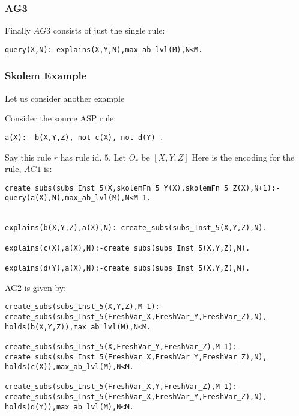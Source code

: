 \documentclass{article}
\begin{document}
\subsubsection{AG3}
Finally $AG3$ consists of just the single rule:
\begin{verbatim}
query(X,N):-explains(X,Y,N),max_ab_lvl(M),N<M.
\end{verbatim}
\subsubsection{Skolem Example}
Let us consider another example

Consider the source ASP rule:
\begin{verbatim}
a(X):- b(X,Y,Z), not c(X), not d(Y) .    
\end{verbatim}
Say this rule $r$ has rule id. $5$. 
Let $O_{r}$ be $[X,Y,Z]$ Here is the encoding for the rule, $AG1$ is:
\begin{verbatim}
create_subs(subs_Inst_5(X,skolemFn_5_Y(X),skolemFn_5_Z(X),N+1):-query(a(X),N),max_ab_lvl(M),N<M-1.


explains(b(X,Y,Z),a(X),N):-create_subs(subs_Inst_5(X,Y,Z),N).

explains(c(X),a(X),N):-create_subs(subs_Inst_5(X,Y,Z),N).

explains(d(Y),a(X),N):-create_subs(subs_Inst_5(X,Y,Z),N).

\end{verbatim}
AG2 is given by:
\begin{verbatim}
create_subs(subs_Inst_5(X,Y,Z),M-1):-create_subs(subs_Inst_5(FreshVar_X,FreshVar_Y,FreshVar_Z),N), 
holds(b(X,Y,Z)),max_ab_lvl(M),N<M.

create_subs(subs_Inst_5(X,FreshVar_Y,FreshVar_Z),M-1):-
create_subs(subs_Inst_5(FreshVar_X,FreshVar_Y,FreshVar_Z),N), holds(c(X)),max_ab_lvl(M),N<M.

create_subs(subs_Inst_5(FreshVar_X,Y,FreshVar_Z),M-1):-
create_subs(subs_Inst_5(FreshVar_X,FreshVar_Y,FreshVar_Z),N), holds(d(Y)),max_ab_lvl(M),N<M.
\end{verbatim}
\end{document}
